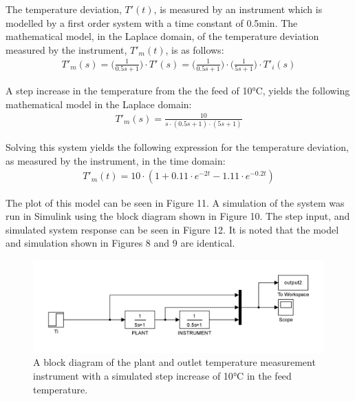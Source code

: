 \documentclass{article}
\begin{document}
The temperature deviation, $T'(t)$, is measured by an instrument which is modelled by a first order system with a time constant of 0.5$\si{\minute}$. The mathematical model, in the Laplace domain, of the temperature deviation measured by the instrument, $T'_m(t)$, is as follows: 
\begin{align*}
T'_m(s) = \bigg(\frac{1}{0.5 s + 1}\bigg) \cdot T'(s) = \bigg(\frac{1}{0.5s + 1}\bigg) \cdot \bigg(\frac{1}{5s + 1}\bigg) \cdot T'_i(s)
\end{align*}

A step increase in the temperature from the the feed of 10$\si{\degreeCelsius}$, yields the following mathematical model in the Laplace domain:
\begin{align*}
T'_m(s) = \frac{10}{s \cdot (0.5s + 1) \cdot (5s + 1)}
\end{align*}

Solving this system yields the following expression for the temperature deviation, as measured by the instrument, in the time domain:
\begin{align}
T'_m(t) = 10 \cdot (1 + 0.11 \cdot e^{-2t} - 1.11 \cdot e^{-0.2t})
\end{align} 

The plot of this model can be seen in Figure 11. A simulation of the system was run in Simulink using the block diagram shown in Figure 10. The step input, and simulated system response can be seen in Figure 12. It is noted that the model and simulation shown in Figures 8 and 9 are identical.\\

\begin{figure}[h]
\centering
\includegraphics[scale=0.15]{block_2}
\caption{A block diagram of the plant and outlet temperature measurement instrument with a simulated step increase of 10$\si{\degreeCelsius}$ in the feed temperature.}
\end{figure}
\end{document}
